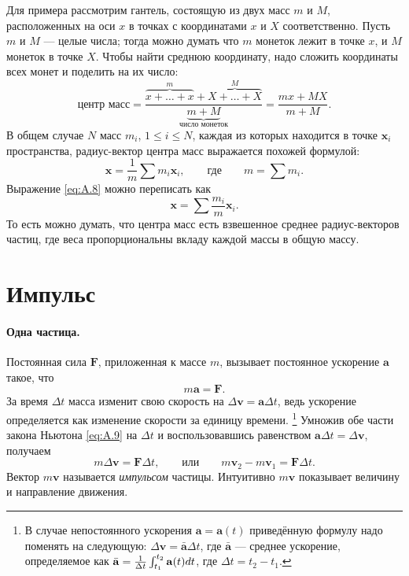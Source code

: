Для примера рассмотрим гантель, состоящую из двух масс $m$ и $M$, расположенных на оси $x$ в точках с координатами $x$ и $X$ соответственно.
Пусть $m$ и $M$ --- целые числа;
тогда можно думать что $m$ монеток лежит в точке $x$,
и $M$ монеток в точке $X$.
Чтобы найти среднюю координату, надо сложить координаты всех монет и поделить на их число:
\[
\text{центр масс} =
\frac{\overbrace{x+\dots+x}^{m}+\overbrace{X+\dots+X}^{M}}{\underbrace{m+M}_{\text{число монеток}}}
=\frac{mx+MX}{m+M}.
\]
В общем случае $N$ масс $m_i$, $1 \le i \le N$, каждая из
которых находится в точке $\mathbf{x}_i$ пространства, радиус-вектор
центра масс выражается похожей формулой:
\begin{equation}
    \mathbf{x}=\frac{1}{m} \sum m_i  \mathbf{x}_i,
    \qquad\text{где}\qquad m=\sum m_i.
    \label{eq:A.8}
\end{equation}
Выражение \eqref{eq:A.8} можно переписать как
\[
\mathbf{x}=\sum \frac{m_i}{m}  \mathbf{x}_i.
\]
То есть можно думать, что центра масс есть взвешенное среднее радиус-векторов частиц, где веса пропорциональны вкладу каждой массы в общую массу.

\section{Импульс}\label{Импульс}\label{sec:A.4}

\paragraph{Одна частица.}
Постоянная сила $\mathbf{F}$, приложенная
к массе $m$, вызывает постоянное ускорение $\mathbf{a}$ такое, что
\begin{equation}
    m \mathbf{a}=\mathbf{F}.
    \label{eq:A.9}
\end{equation}
За время $\Delta t$ масса изменит свою скорость на
$\Delta \mathbf{v}=\mathbf{a}\Delta t$, ведь ускорение определяется как изменение скорости за единицу времени.%
\footnote{В случае непостоянного ускорения $\mathbf{a}= \mathbf{a}(t)$ приведённую формулу надо поменять на следующую: $\Delta \mathbf{v}=\bar{\mathbf{a}}  \Delta t$,
где $\bar{\mathbf{a}}$ --- среднее ускорение, определяемое как
$\bar{\mathbf{a}} \z= \frac{1}{\Delta t} \int_{t_1}^{t_2} \mathbf{a}(t) dt$,
где $\Delta t=t_2-t_1$.
}
Умножив обе части закона Ньютона \eqref{eq:A.9} на $\Delta t$
и воспользовавшись равенством $\mathbf{a}\Delta t=\Delta \mathbf{v}$, получаем
\begin{equation}
m \Delta \mathbf{v}=\mathbf{F}\Delta t,
\qquad \text{или} \qquad
m \mathbf{v}_2-m \mathbf{v}_1=\mathbf{F}\Delta t.
\label{eq:A.10}
\end{equation}
Вектор $m\mathbf{v}$ называется \textit{импульсом} частицы.
Интуитивно $m\mathbf{v}$ показывает величину и направление движения.

